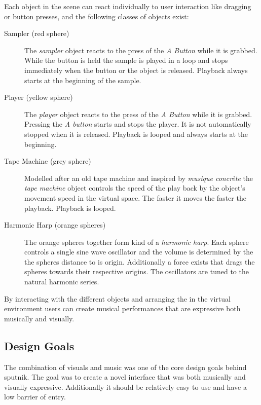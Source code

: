 \documentclass[10pt,a4paper]{scrartcl}
\begin{document}
Each object in the scene can react individually to user interaction like dragging or button presses, and the following classes of objects exist:
\begin{description}
\item[Sampler (red sphere)] The \emph{sampler} object reacts to the press of the \emph{A Button} while it is grabbed. While the button is held the sample is played in a loop and stops immediately when the button or the object is released. Playback always starts at the beginning of the sample.

\item[Player (yellow sphere)] The \emph{player} object reacts to the press of the \emph{A Button} while it is grabbed. Pressing the \emph{A button} starts and stops the player. It is not automatically stopped when it is released. Playback is looped and always starts at the beginning.

\item[Tape Machine (grey sphere)] Modelled after an old tape machine and inspired by \emph{musique concrète} the \emph{tape machine} object controls the speed of the play back by the object's movement speed in the virtual space. The faster it moves the faster the playback. Playback is looped.

\item[Harmonic Harp (orange spheres)] The orange spheres together form kind of a \emph{harmonic harp}. Each sphere controls a single sine wave oscillator and the volume is determined by the the spheres distance to is origin. Additionally a force exists that drags the spheres towards their respective origins. The oscillators are tuned to the natural harmonic series.
\end{description}

By interacting with the different objects and arranging the in the virtual environment users can create musical performances that are expressive both musically and visually.


\subsection{Design Goals}

The combination of visuals and music was one of the core design goals behind sputnik. The goal was to create a novel interface that was both musically and visually expressive. Additionally it should be relatively easy to use and have a low barrier of entry.
\end{document}
